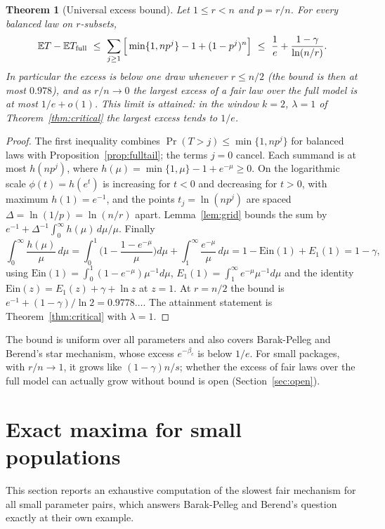 \documentclass[11pt,a4paper]{article}
\newtheorem{theorem}{Theorem}[section]
\theoremstyle{remark}
\newcommand{\E}{\mathbb E}
\begin{document}
\begin{theorem}[Universal excess bound]\label{thm:gap}
Let $1\le r<n$ and $p=r/n$. For every balanced law on $r$-subsets,
\[
 \E T-\E T_{\rm full}\ \le\ \sum_{j\ge1}\Big[\min\{1,np^j\}-1+(1-p^j)^n\Big]\ \le\ \frac1e+\frac{1-\gamma}{\ln(n/r)} .
\]
In particular the excess is below one draw whenever $r\le n/2$ (the bound is then at most $0.978$), and as $r/n\to0$ the largest excess of a fair law over the full model is at most $1/e+o(1)$. This limit is attained: in the window $k=2$, $\lambda=1$ of Theorem~\ref{thm:critical} the largest excess tends to $1/e$.
\end{theorem}
\begin{proof}
The first inequality combines $\Pr(T>j)\le\min\{1,np^j\}$ for balanced laws with Proposition~\ref{prop:fulltail}; the terms $j=0$ cancel. Each summand is at most $h(np^j)$, where $h(\mu)=\min\{1,\mu\}-1+e^{-\mu}\ge0$. On the logarithmic scale $\phi(t)=h(e^t)$ is increasing for $t<0$ and decreasing for $t>0$, with maximum $h(1)=e^{-1}$, and the points $t_j=\ln(np^j)$ are spaced $\Delta=\ln(1/p)=\ln(n/r)$ apart. Lemma~\ref{lem:grid} bounds the sum by $e^{-1}+\Delta^{-1}\int_0^\infty h(\mu)\,d\mu/\mu$. Finally
\[
 \int_0^\infty\frac{h(\mu)}{\mu}\,d\mu=\int_0^1\Big(1-\frac{1-e^{-\mu}}{\mu}\Big)d\mu+\int_1^\infty\frac{e^{-\mu}}{\mu}\,d\mu=1-\mathrm{Ein}(1)+E_1(1)=1-\gamma,
\]
using $\mathrm{Ein}(1)=\int_0^1(1-e^{-\mu})\mu^{-1}d\mu$, $E_1(1)=\int_1^\infty e^{-\mu}\mu^{-1}d\mu$ and the identity $\mathrm{Ein}(z)=E_1(z)+\gamma+\ln z$ at $z=1$. At $r=n/2$ the bound is $e^{-1}+(1-\gamma)/\ln2=0.9778\ldots$. The attainment statement is Theorem~\ref{thm:critical} with $\lambda=1$.
\end{proof}

The bound is uniform over all parameters and also covers Barak-Pelleg and Berend's star mechanism, whose excess $e^{-\beta_c}$ is below $1/e$. For small packages, with $r/n\to1$, it grows like $(1-\gamma)n/s$; whether the excess of fair laws over the full model can actually grow without bound is open (Section~\ref{sec:open}).

\section{Exact maxima for small populations}
\label{sec:small}
This section reports an exhaustive computation of the slowest fair mechanism for all small parameter pairs, which answers Barak-Pelleg and Berend's question exactly at their own example.
\end{document}
